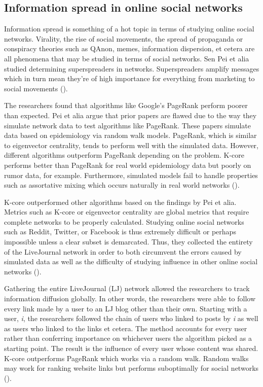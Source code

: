 \documentclass[12pt, a4paper]{article}
\begin{document}
\subsection{Information spread in online social networks}
Information spread is something of a hot topic in terms of studying online social networks. Virality, the rise of social movements, the spread of propaganda or conspiracy theories such as QAnon, memes, information dispersion, et cetera are all phenomena that may be studied in terms of social networks. Sen Pei et alia studied determining superspreaders in networks. Superspreaders amplify messages which in turn mean they're of high importance for everything from marketing to social movements (\cite{peispread2014}).

The researchers found that algorithms like Google's PageRank perform poorer than expected. Pei et alia argue that prior papers are flawed due to the way they simulate network data to test algorithms like PageRank. These papers simulate data based on epidemiology via random walk models. PageRank, which is similar to eigenvector centrality, tends to perform well with the simulated data. However, different algorithms outperform PageRank depending on the problem. K-core performs better than PageRank for real world epidemiology data but poorly on rumor data, for example. Furthermore, simulated models fail to handle properties such as assortative mixing which occurs naturally in real world networks (\cite{peispread2014}).

K-core outperformed other algorithms based on the findings by Pei et alia. Metrics such as K-core or eigenvector centrality are global metrics that require complete networks to be properly calculated. Studying online social networks such as Reddit, Twitter, or Facebook is thus extremely difficult or perhaps impossible unless a clear subset is demarcated. Thus, they collected the entirety of the LiveJournal network in order to both circumvent the errors caused by simulated data as well as the difficulty of studying influence in other online social networks (\cite{peispread2014}).

Gathering the entire LiveJournal (LJ) network allowed the researchers to track information diffusion globally. In other words, the researchers were able to follow every link made by a user to an LJ blog other than their own. Starting with a user, \textit{i}, the researchers followed the chain of users who linked to posts by \textit{i} as well as users who linked to the links et cetera. The method accounts for every user rather than conferring importance on whichever users the algorithm picked as a starting point. The result is the influence of every user whose content was shared. K-core outperforms PageRank which works via a random walk. Random walks may work for ranking website links but performs suboptimally for social networks (\cite{peispread2014}).
\end{document}
